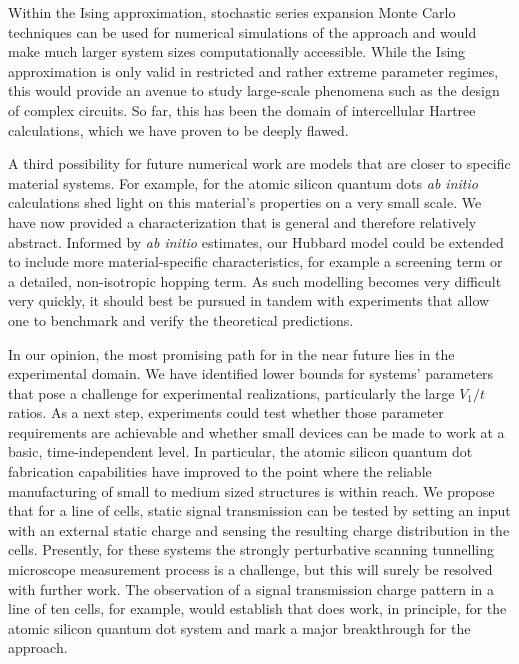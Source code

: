 Within the Ising approximation, stochastic series expansion Monte Carlo
techniques can be used for numerical simulations of the  approach and
would make much larger system sizes computationally accessible. While the Ising
approximation is only valid in restricted and rather extreme parameter regimes,
this would provide an avenue to study large-scale phenomena such as the design
of complex  circuits. So far, this has been the domain of
intercellular Hartree calculations, which we have proven to be deeply flawed.

A third possibility for future numerical work are models that are closer to
specific material systems. For example, for the atomic silicon quantum dots
\emph{ab initio} calculations shed light on this material's properties on a very
small scale. We have now provided a  characterization that is general
and therefore relatively abstract. Informed by \emph{ab initio} estimates, our
Hubbard model could be extended to include more material-specific
characteristics, for example a screening term or a detailed, non-isotropic
hopping term. As such modelling becomes very difficult very quickly, it should
best be pursued in tandem with experiments that allow one to benchmark and
verify the theoretical predictions.

In our opinion, the most promising path for  in the near future lies
in the experimental domain. We have identified lower bounds for 
systems' parameters that pose a challenge for experimental realizations,
particularly the large $V_1/t$ ratios. As a next step, experiments could test
whether those parameter requirements are achievable and whether small 
devices can be made to work at a basic, time-independent level. In particular,
the atomic silicon quantum dot fabrication capabilities have improved to the
point where the reliable manufacturing of small to medium sized structures is
within reach. We propose that for a line of cells, static signal transmission
can be tested by setting an input with an external static charge and sensing the
resulting charge distribution in the cells. Presently, for these systems the
strongly perturbative scanning tunnelling microscope measurement process is a
challenge, but this will surely be resolved with further work. The observation
of a signal transmission charge pattern in a line of ten cells, for example,
would establish that  does work, in principle, for the atomic silicon
quantum dot system and mark a major breakthrough for the  approach.
